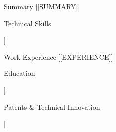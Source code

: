 \documentclass{resume} %
\begin{document}
\begin{rSection}{Summary}
[[SUMMARY]]
\end{rSection}

\begin{rSection}{Technical Skills}
\begin{itemize}[topsep=-0.1cm,itemsep=0pt,partopsep=0pt, parsep=0.1pt]
[[SKILLS]]
\end{itemize}
\end{rSection}

\begin{rSection}{Work Experience}
[[EXPERIENCE]]
\end{rSection}

\begin{rSection}{Education}
\begin{itemize}[topsep=-0.1cm,itemsep=0pt,partopsep=0pt, parsep=0.1pt]
[[EDUCATION]]
\end{itemize}
\end{rSection}

\begin{rSection}{Patents \& Technical Innovation}
\begin{itemize}[topsep=-0.1cm,itemsep=0pt,partopsep=0pt, parsep=0.1pt]
[[PATENTS]]
\end{itemize}
\end{rSection}
\end{document}
